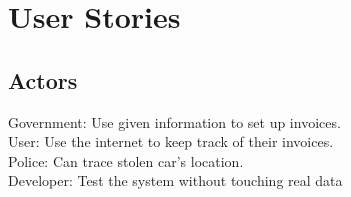 \chapter{User Stories}
\section{Actors}
Government: Use given information to set up invoices.\\
User: Use the internet to keep track of their invoices.\\
Police: Can trace stolen car’s location.\\
Developer: Test the system without touching real data\\
